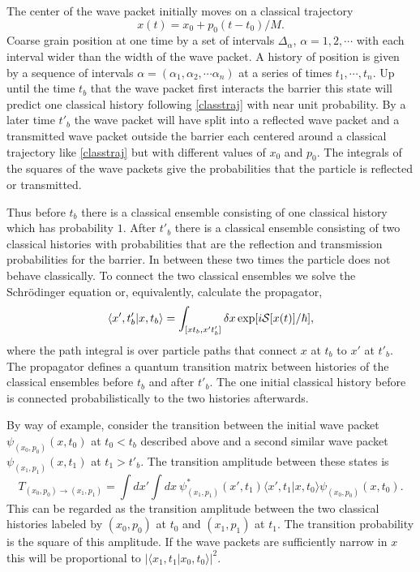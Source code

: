 \documentclass[prd,floats,superscriptaddress,eqsecnum,floatfix,nofootinbib,12pt]{revtex4}
\def\be{\begin{equation}}
\def\ee{\end{equation}}
\def\qf{}
\def\j2{}
\begin{document}
{{{ The center of the wave packet initially moves on a classical trajectory
\be
\label{classtraj}
x(t) = x_0 + p_0 (t-t_0)/M.
\ee
Coarse grain position at one time by a set of intervals $\Delta_\alpha$, $\alpha = 1,2, \cdots$ with each interval wider than the width of the wave packet.  A history of position is given by a sequence of intervals $\alpha=(\alpha_1, \alpha_2, \cdots \alpha_n)$ at a series of times $t_1,\cdots, t_n$. Up until the time $t_{b} $ that the wave packet first interacts the barrier this state will predict one classical history following \eqref{classtraj} with near unit probability.  By a later time $t'_{b}$ the wave packet will have split into a reflected wave packet and a transmitted wave packet outside the barrier each centered around a classical trajectory like \eqref{classtraj} but with different values of $x_0$ and $p_0$. The integrals of the squares of the wave packets give the probabilities that the particle is reflected or transmitted. 

Thus before $t_b$ there is a classical ensemble consisting of one classical history which has probability $1$.
After $t'_b$ there is a classical ensemble consisting of two classical histories with probabilities that are the reflection and transmission probabilities for the barrier.   In between these two times the particle does not behave classically. To connect the two classical ensembles we solve the Schr\"odinger equation or, equivalently, calculate the propagator,
\be
\label{nrprop}
\langle x', t'_b | x, t_b \rangle = \int_{[x t_b, x' t'_b]} \delta x \exp [i {\cal S}[x(t)]/\hbar] ,
\ee
where the path integral is over particle paths that connect $x$ at $t_b$ to $x'$ at $t'_b$. The propagator defines a quantum transition matrix between{\j2 histories}  of the classical ensembles before $t_b$ and after $t'_b$.  The one initial classical history before is connected probabilistically to the two histories afterwards. 

{\qf By  way of example, consider the transition between the initial wave packet $\psi_{(x_0,p_0)}(x, t_0)$ at $t_0<t_b$ described above and a second similar wave packet $\psi_{(x_1,p_1)}(x, t_1)$ at $t_1>t'_b$. The transition amplitude between these states  is 
\be
\label{transbarrier}
T_{(x_0,p_0)\rightarrow(x_1,p_1)}=\int dx' \int dx  \ \psi^*_{(x_1,p_1)}(x', t_1)\langle x', t_1 | x, t_0 \rangle\psi_{(x_0,p_0)}(x, t_0) .
\ee
This can be regarded as the transition amplitude between the  two classical histories labeled by $(x_0,p_0)$ at  $t_0$ and $(x_1,p_1)$ at  $t_1$. The transition probability is the square of this amplitude. If the wave packets are sufficiently narrow in $x$ this will be proportional to $|\langle x_1, t_1 | x_0, t_0 \rangle|^2$. 

}}}}
\end{document}

